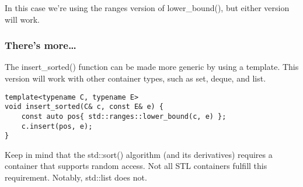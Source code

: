 In this case we're using the ranges version of lower\_bound(), but either version will work.

\subsubsection{There's more…}

The insert\_sorted() function can be made more generic by using a template. This version will work with other container types, such as set, deque, and list.

\begin{lstlisting}[style=styleCXX]
template<typename C, typename E>
void insert_sorted(C& c, const E& e) {
	const auto pos{ std::ranges::lower_bound(c, e) };
	c.insert(pos, e);
}
\end{lstlisting}

Keep in mind that the std::sort() algorithm (and its derivatives) requires a container that supports random access. Not all STL containers fulfill this requirement. Notably, std::list does not.



















